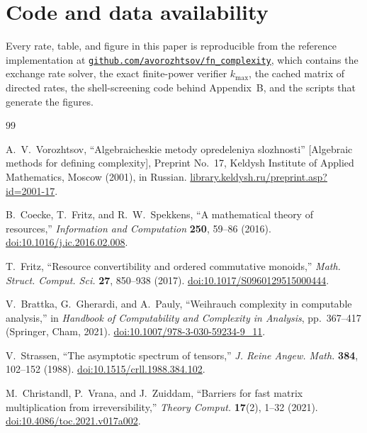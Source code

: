 \documentclass[11pt]{article}
\theoremstyle{definition}
\theoremstyle{remark}
\begin{document}
\section*{Code and data availability}

Every rate, table, and figure in this paper is reproducible from the reference
implementation at
\href{https://github.com/avorozhtsov/fn_complexity}
{\texttt{github.com/avorozhtsov/fn\_complexity}}, which contains the exchange
rate solver, the exact finite-power verifier \(k_{\max}\), the cached matrix of
directed rates, the shell-screening code behind Appendix~B, and the scripts
that generate the figures.

\begin{thebibliography}{99}
\raggedright

A.~V.~Vorozhtsov,
``Algebraicheskie metody opredeleniya slozhnosti''
[Algebraic methods for defining complexity],
Preprint No.~17, Keldysh Institute of Applied Mathematics, Moscow (2001),
in Russian.
\href{https://library.keldysh.ru/preprint.asp?id=2001-17}
{library.keldysh.ru/preprint.asp?id=2001-17}.

B.~Coecke, T.~Fritz, and R.~W.~Spekkens,
``A mathematical theory of resources,''
\emph{Information and Computation} \textbf{250}, 59--86 (2016).
\href{https://doi.org/10.1016/j.ic.2016.02.008}
{doi:10.1016/j.ic.2016.02.008}.

T.~Fritz,
``Resource convertibility and ordered commutative monoids,''
\emph{Math. Struct. Comput. Sci.} \textbf{27}, 850--938 (2017).
\href{https://doi.org/10.1017/S0960129515000444}
{doi:10.1017/S0960129515000444}.

V.~Brattka, G.~Gherardi, and A.~Pauly,
``Weihrauch complexity in computable analysis,''
in \emph{Handbook of Computability and Complexity in Analysis},
pp.~367--417 (Springer, Cham, 2021).
\href{https://doi.org/10.1007/978-3-030-59234-9_11}
{doi:10.1007/978-3-030-59234-9\_11}.

V.~Strassen,
``The asymptotic spectrum of tensors,''
\emph{J. Reine Angew. Math.} \textbf{384}, 102--152 (1988).
\href{https://doi.org/10.1515/crll.1988.384.102}
{doi:10.1515/crll.1988.384.102}.

M.~Christandl, P.~Vrana, and J.~Zuiddam,
``Barriers for fast matrix multiplication from irreversibility,''
\emph{Theory Comput.} \textbf{17}(2), 1--32 (2021).
\href{https://doi.org/10.4086/toc.2021.v017a002}
{doi:10.4086/toc.2021.v017a002}.


\end{thebibliography}
\end{document}
